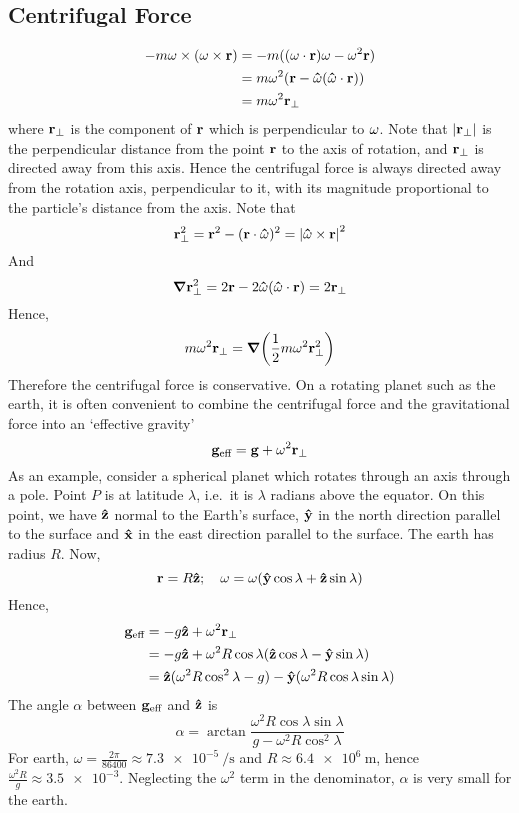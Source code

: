 \subsection{Centrifugal Force}
\begin{align*}
	-m\vb\omega \times (\vb\omega \times \vb r) & = -m((\vb\omega \cdot \vb r)\vb\omega - \vb\omega^2\vb r) \\
	                                            & = m\omega^2(\vb r - \vu\omega(\vu\omega \cdot \vb r))     \\
	                                            & = m\omega^2 \vb r_\perp
\end{align*}
where \(\vb r_\perp\) is the component of \(\vb r\) which is perpendicular to \(\vb\omega\).
Note that \(\abs{\vb r_\perp}\) is the perpendicular distance from the point \(\vb r\) to the axis of rotation, and \(\vb r_\perp\) is directed away from this axis.
Hence the centrifugal force is always directed away from the rotation axis, perpendicular to it, with its magnitude proportional to the particle's distance from the axis.
Note that
\[
	\vb r_\perp^2 = \vb r^2 - (\vb r \cdot \vu\omega)^2 = \abs{\vu\omega \times \vb r}^2
\]
And
\[
	\grad \vb r_\perp^2 = 2\vb r - 2\vu\omega(\vu\omega \cdot \vb r) = 2\vb r_\perp
\]
Hence,
\[
	m\omega^2\vb r_\perp = \grad(\frac{1}{2}m\omega^2\vb r_\perp^2)
\]
Therefore the centrifugal force is conservative.
On a rotating planet such as the earth, it is often convenient to combine the centrifugal force and the gravitational force into an `effective gravity'
\[
	\vb g_{\text{eff}} = \vb g + \omega^2 \vb r_\perp
\]
As an example, consider a spherical planet which rotates through an axis through a pole.
Point \(P\) is at latitude \(\lambda\), i.e.\ it is \(\lambda\) radians above the equator.
On this point, we have \(\vu z\) normal to the Earth's surface, \(\vu y\) in the north direction parallel to the surface and \(\vu x\) in the east direction parallel to the surface.
The earth has radius \(R\).
Now,
\[
	\vb r = R\vu z;\quad \vb\omega = \omega(\vu y \cos\lambda + \vu z \sin\lambda)
\]
Hence,
\begin{align*}
	\vb g_\text{eff} & = -g\vu z + \omega^2 \vb r_\perp                                              \\
	                 & = -g\vu z + \omega^2 R\cos\lambda (\vu z \cos\lambda - \vu y \sin\lambda)     \\
	                 & = \vu z(\omega^2 R\cos^2\lambda - g) - \vu y(\omega^2R\cos\lambda\sin\lambda)
\end{align*}
The angle \(\alpha\) between \(\vb g_\text{eff}\) and \(\vu z\) is
\[
	\alpha = \arctan \frac{\omega^2R\cos\lambda\sin\lambda}{g - \omega^2R\cos^2\lambda}
\]
For earth, \(\omega = \frac{2\pi}{86400} \approx \SI{7.3e-5}{\per\second}\) and \(R \approx \SI{6.4e6}{\metre}\), hence \(\frac{\omega^2R}{g} \approx \num{3.5e-3}\).
Neglecting the \(\omega^2\) term in the denominator, \(\alpha\) is very small for the earth.

